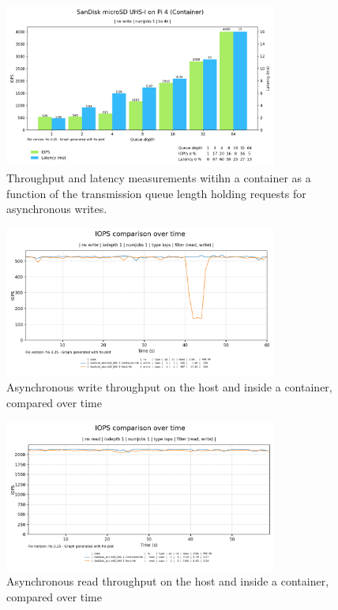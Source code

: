 \begin{figure}[H]
    \centering
    \includegraphics[width=0.8\textwidth]{images/results/sandisk-libaio-write-queue-depth-iops-latency.png}
    \caption{Throughput and latency measurements witihn a container as a function of the transmission queue length holding requests for asynchronous writes.}
    \label{images:fundamentals/net-ns-veth-arch.jpg}
\end{figure}


\begin{figure}[H]
    \centering
    \includegraphics[width=0.8\textwidth]{images/results/sandisk-libaio-iops-write-comparison.png}
    \caption{Asynchronous write throughput on the host and inside a container, compared over time}
    \label{images:fundamentals/net-ns-veth-arch.jpg}
\end{figure}

\begin{figure}[H]
    \centering
    \includegraphics[width=0.8\textwidth]{images/results/sandisk-libaio-iops-read-comparison.png}
    \caption{Asynchronous read throughput on the host and inside a container, compared over time}
    \label{images:fundamentals/net-ns-veth-arch.jpg}
\end{figure}

